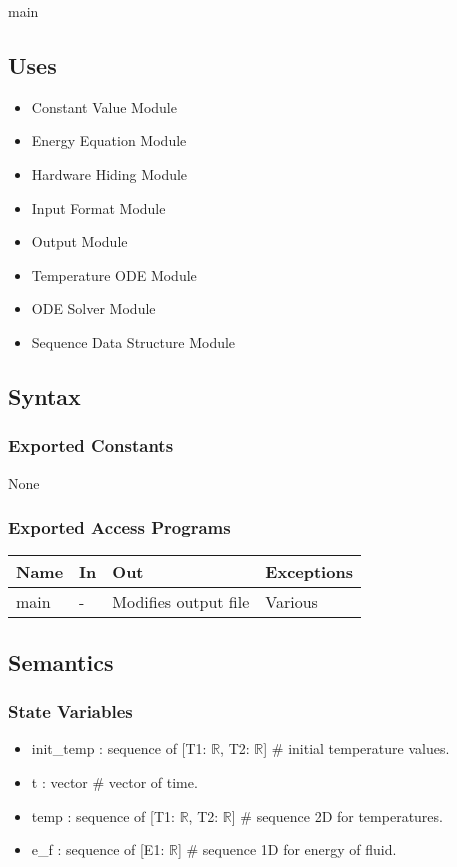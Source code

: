 \documentclass[12pt, titlepage]{article}
\begin{document}
main 

\subsection{Uses}

\begin{itemize}
    \item Constant Value Module
    \item Energy Equation Module
    \item Hardware Hiding Module
    \item Input Format Module 
    \item Output Module 
    \item Temperature ODE Module
    \item ODE Solver Module
    \item Sequence Data Structure Module
\end{itemize}

\subsection{Syntax}

\subsubsection{Exported Constants}
None
\subsubsection{Exported Access Programs}

\begin{center}
\begin{tabular}{p{2cm} p{4cm} p{4cm} p{2cm}}
\hline
\textbf{Name} & \textbf{In} & \textbf{Out} & \textbf{Exceptions} \\
\hline
main & - & Modifies output file & Various \\
\hline
\end{tabular}
\end{center}

\subsection{Semantics}

\subsubsection{State Variables}
\begin{itemize}
    \item init\_temp : sequence of [T1: $\mathbb{R}$, T2: $ \mathbb{R}$]            \# initial temperature values.  
    \item t : vector        \# vector of time. 
    \item temp : sequence of [T1: $\mathbb{R}$, T2: $\mathbb{R}$]   \# sequence 2D for temperatures. 
    \item e\_f : sequence of [E1: $ \mathbb{R}$] \# sequence 1D for energy of fluid. 
\end{itemize}
\end{document}
